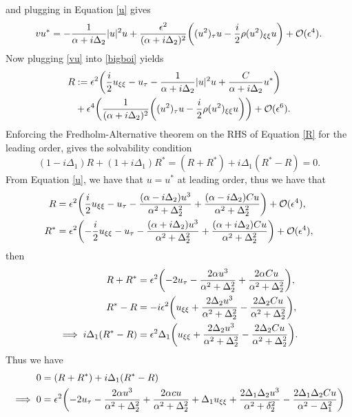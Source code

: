 \documentclass[12pt]{report}
\begin{document}
\begin{solution}
    and plugging in Equation \ref{u} gives
    \begin{equation}
        vu^* = -\frac{1}{\alpha + i \Delta_2}|u|^2u + \frac{{\epsilon}^2}{(\alpha + i \Delta_2)^2}{\left((u^2)_\tau u - \frac{i}{2}\rho(u^2)_{\xi \xi}u\right)} + {\mathcal{O}}({\epsilon}^4). \label{vu}
    \end{equation}
    Now plugging \ref{vu} into \ref{bigboi} yields
    \begin{align}
        R  &:= {\epsilon}^2{\left(\frac{i}{2} u_{\xi \xi} - u_\tau - \frac{1}{\alpha + i \Delta_2}|u|^2u + \frac{C}{\alpha + i \Delta_2}u^*\right)} \nonumber\\
        &+{\epsilon}^4{\left(\frac{1}{(\alpha + i \Delta_2)^2} {\left((u^2)_\tau u - \frac{i}{2}\rho(u^2)_{\xi \xi}u\right)}\right)} + {\mathcal{O}}({\epsilon}^6) \label{R}.
    \end{align}
    Enforcing the Fredholm-Alternative theorem on the RHS of Equation \ref{R} for the leading order, gives the solvability condition
    \[ 
        (1 - i\Delta_1)R + (1 + i\Delta_1)R^* = (R + R^*) + i\Delta_1(R^* - R) = 0.
    \]
    From Equation \ref{u}, we have that $u = u^*$ at leading order, thus we have that
    \begin{align*}
        R  &= {\epsilon}^2{\left(\frac{i}{2} u_{\xi \xi} - u_\tau - \frac{(\alpha - i \Delta_2)u^3}{\alpha^2 +  \Delta_2^2} + \frac{(\alpha - i \Delta_2)Cu}{\alpha^2 +  \Delta_2^2}\right)} + {\mathcal{O}}({\epsilon}^4),\\
        R^*  &= {\epsilon}^2{\left(-\frac{i}{2} u_{\xi \xi} - u_\tau - \frac{(\alpha + i \Delta_2)u^3}{\alpha^2 +  \Delta_2^2} + \frac{(\alpha + i \Delta_2)Cu}{\alpha^2 +  \Delta_2^2}\right)} + {\mathcal{O}}({\epsilon}^4),\\
    \end{align*} 
    then
    \begin{align*}
        R + R^* &= {\epsilon}^2{\left(-2u_\tau - \frac{2\alpha u^3}{\alpha^2 + \Delta_2^2} + \frac{2\alpha C u}{\alpha^2 + \Delta_2^2}\right)},\\
        R^* - R &= -i {\epsilon}^2 {\left(u_{\xi \xi} + \frac{2\Delta_2u^3}{\alpha^2 + \Delta_2^2} - \frac{2\Delta_2 Cu}{\alpha^2 + \Delta_2^2}\right)},\\
        \implies i \Delta_1(R^* - R) &= {\epsilon}^2 \Delta_1 {\left(u_{\xi \xi} + \frac{2\Delta_2u^3}{\alpha^2 + \Delta_2^2} - \frac{2\Delta_2 Cu}{\alpha^2 + \Delta_2^2}\right)}.
    \end{align*}
    Thus we have
    \begin{align*}
        0 &= (R + R^*) + i\Delta_1(R^* - R) \\ 
        \implies 0 &=  \eps^2 \paren{-2 u_\tau - \frac{2\alpha u^3}{\alpha^2 + \Delta_2^2} + \frac{2\alpha c u}{\alpha^2 + \Delta_2^2} + \Delta_1 u_{\xi \xi} + \frac{2\Delta_1\Delta_2u^3}{\alpha^2 + \delta_2^2} - \frac{2\Delta_1\Delta_2 Cu}{\alpha^2 - \Delta_1^2}}\\

\end{align*}
\end{solution}
\end{document}
